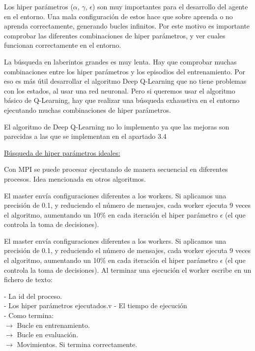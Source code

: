 	Los hiper parámetros ($\alpha$, $\gamma$, $\epsilon$) son muy importantes para el desarrollo del agente en el entorno. Una mala configuración de estos hace que sobre aprenda o no aprenda correctamente, generando bucles infinitos. Por este motivo es importante comprobar las diferentes combinaciones de hiper parámetros, y ver cuales funcionan correctamente en el entorno.
	
	La búsqueda en laberintos grandes es muy lenta. Hay que comprobar muchas combinaciones entre los hiper parámetros y los episodios del entrenamiento. Por eso es más útil desarrollar el algoritmo Deep Q-Learning que no tiene problemas con los estados, al usar una red neuronal. Pero si queremos usar el algoritmo básico de Q-Learning, hay que realizar una búsqueda exhaustiva en el entorno ejecutando muchas  combinaciones de hiper parámetros.
	
	\color{red}El algoritmo de Deep Q-Learning no lo implemento ya que las mejoras son parecidas a las que se implementan en el apartado 3.4
	\color{black}
	
	\begin{flushleft}
		\underline{Búsqueda de hiper parámetros ideales:	}
	\end{flushleft}
	Con MPI se puede procesar ejecutando de manera secuencial en diferentes procesos. Idea mencionada en otros algoritmos. 
	
	El master envía configuraciones diferentes a los workers. Si aplicamos una precisión de 0.1, y reduciendo el número de mensajes, cada worker ejecuta 9 veces el algoritmo, aumentando un 10\% en cada iteración el hiper parámetro $\epsilon$ (el que controla la toma de decisiones). 
	
	\begin{mdframed}[roundcorner=5pt]
		El master envía configuraciones diferentes a los workers. Si aplicamos una precisión de 0.1, y reduciendo el número de mensajes, cada worker ejecuta 9 veces el algoritmo, aumentando un 10\% en cada iteración el hiper parámetro $\epsilon$ (el que controla la toma de decisiones). Al terminar una ejecución el worker escribe en un fichero de texto: 
		
		
		\begin{tcolorbox}[boxrule=0.5pt, fontupper=\small]			
			- La id del proceso. \\
			- Los hiper parámetros ejecutados.v
			- El tiempo de ejecución \\
			- Como termina:\\
			$\rightarrow$ Bucle en entrenamiento.\\
			$\rightarrow$ Bucle en evaluación.\\
			$\rightarrow$ Movimientos. Si termina correctamente.
				
			
		\end{tcolorbox}
		
	\end{mdframed}
	
